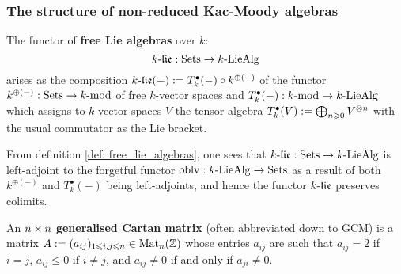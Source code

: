         \subsubsection{The structure of non-reduced Kac-Moody algebras}
            \begin{definition} \label{def: free_lie_algebras}
                The functor of \textbf{free Lie algebras} over $k$:
                    $$k\text{-}\mathfrak{lie}: \mathrm{Sets} \to k\text{-}\mathrm{Lie}\mathrm{Alg}$$
                arises as the composition $k\text{-}\mathfrak{lie}(-) := T_k^{\bullet}(-) \circ k^{\oplus (-)}$ of the functor $k^{\oplus (-)}: \mathrm{Sets} \to k\text{-}\mathrm{mod}$ of free $k$-vector spaces and $T_k^{\bullet}(-): k\text{-}\mathrm{mod} \to k\text{-}\mathrm{Lie}\mathrm{Alg}$ which assigns to $k$-vector spaces $V$ the tensor algebra $T_k^{\bullet}(V) := \bigoplus_{n \geq 0} V^{\tensor n}$ with the usual commutator as the Lie bracket. 
            \end{definition}
            \begin{remark}
                From definition \ref{def: free_lie_algebras}, one sees that $k\text{-}\mathfrak{lie}: \mathrm{Sets} \to k\text{-}\mathrm{Lie}\mathrm{Alg}$ is left-adjoint to the forgetful functor $\mathrm{oblv}: k\text{-}\mathrm{Lie}\mathrm{Alg} \to \mathrm{Sets}$ as a result of both $k^{\oplus (-)}$ and $T_k^{\bullet}(-)$ being left-adjoints, and hence the functor $k\text{-}\mathfrak{lie}$ preserves colimits. 
            \end{remark}
            \begin{definition} \label{def: generalised_cartan_matrices}
                An $n \x n$ \textbf{generalised Cartan matrix} (often abbreviated down to GCM) is a matrix $A := (a_{ij})_{1 \leqslant i, j \leqslant n} \in \mathrm{Mat}_n(\mathbb{Z})$ whose entries $a_{ij}$ are such that $a_{ij} = 2$ if $i = j$, $a_{ij} \leq 0$ if $i \not = j$, and $a_{ij} \not = 0$ if and only if $a_{ji} \not = 0$.
            \end{definition}
